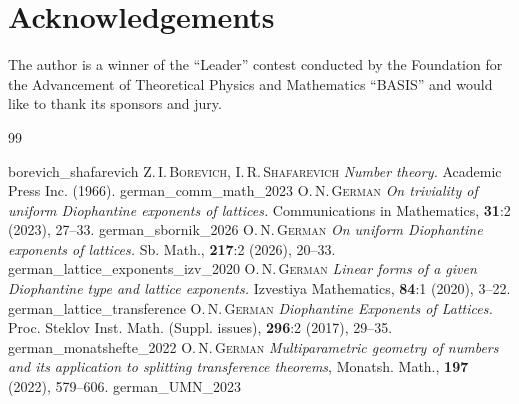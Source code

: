 \documentclass[a4paper,12pt]{article}
\theoremstyle{definition}
\theoremstyle{remark}
\theoremstyle{plain}
\begin{document}
\section*{Acknowledgements}
The author is a winner of the ``Leader'' contest con\-duct\-ed by the Foundation for the Advancement of Theoretical Physics and Mathematics ``BASIS'' and would like to thank its sponsors and jury.



\begin{thebibliography}{99}

\bibitem
    {borevich_shafarevich}
    \textsc{Z.\,I.\,Borevich, I.\,R.\,Shafarevich}
    \textit{Number theory.}
    Academic Press Inc. (1966).
\bibitem
    {german_comm_math_2023}
    \textsc{O.\,N.\,German}
    \textit{On triviality of uniform Diophantine exponents of lattices.}
    Commu\-ni\-ca\-tions in Mathematics,
    \textbf{31}:2 (2023), 27--33.
\bibitem
    {german_sbornik_2026}
    \textsc{O.\,N.\,German}
    \textit{On uniform Diophantine exponents of lattices.}
    Sb. Math., \textbf{217}:2 (2026), 20--33.
\bibitem
    {german_lattice_exponents_izv_2020}
    \textsc{O.\,N.\,German}
    \textit{Linear forms of a given Diophantine type and lattice exponents.}
    Izvestiya Mathematics, \textbf{84}:1 (2020), 3--22.
\bibitem
    {german_lattice_transference}
    \textsc{O.\,N.\,German}
    \textit{Diophantine Exponents of Lattices.}
    Proc. Steklov Inst. Math. (Suppl. issues), \textbf{296}:2 (2017), 29--35.
\bibitem
    {german_monatshefte_2022}
    \textsc{O.\,N.\,German}
    \textit{Multiparametric geometry of numbers and its application to splitting transference theorems},
    Monatsh. Math., \textbf{197} (2022), 579--606.
\bibitem
    {german_UMN_2023}

\end{thebibliography}
\end{document}
